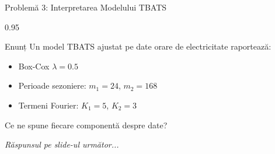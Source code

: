 \documentclass[9pt, aspectratio=169, t]{beamer}
\begin{document}
\begin{frame}{Problemă 3: Interpretarea Modelului TBATS}
    \begin{cminipage}{0.95\textwidth}
    \begin{block}{Enunț}
        Un model TBATS ajustat pe date orare de electricitate raportează:
        \begin{itemize}\setlength{\itemsep}{0pt}
            \item Box-Cox $\lambda = 0.5$
            \item Perioade sezoniere: $m_1 = 24$, $m_2 = 168$
            \item Termeni Fourier: $K_1 = 5$, $K_2 = 3$
        \end{itemize}

        Ce ne spune fiecare componentă despre date?
    \end{block}

    \vspace{0.5cm}
    \begin{flushright}\textit{Răspunsul pe slide-ul următor...}\end{flushright}
    \end{cminipage}
\end{frame}
\end{document}
